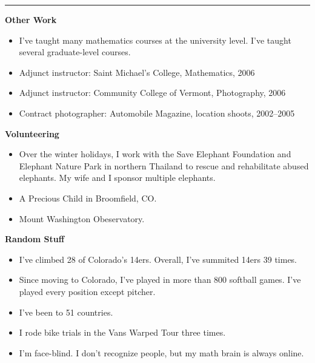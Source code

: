 \documentclass[letterpaper,10pt]{article}
\newcommand{\mblue}{\color{darkblue}}
\begin{document}
\vspace{-2.15pc}
{\hfill\mblue\rule{5.91in}{0.02cm}}

\vspace{1pc}
\textbf{Other Work}

\begin{itemize}
    \item I've taught many mathematics courses at the university level. I've taught several graduate-level courses.
    \item Adjunct instructor: Saint Michael's College, Mathematics, 2006
    \item Adjunct instructor: Community College of Vermont, Photography, 2006
    \item Contract photographer: Automobile Magazine, location shoots, 2002--2005
\end{itemize}

\vspace{1pc}
\textbf{Volunteering}

\begin{itemize}
    \item Over the winter holidays, I work with the Save Elephant Foundation and Elephant Nature Park in northern Thailand to rescue and rehabilitate abused elephants. My wife and I sponsor multiple elephants.
    \item A Precious Child in Broomfield, CO.
    \item Mount Washington Obeservatory.
\end{itemize}

\vspace{1pc}
\textbf{Random Stuff}

\begin{itemize}
    \item I've climbed 28 of Colorado's 14ers. Overall, I've summited 14ers 39 times.
    \item Since moving to Colorado, I've played in more than 800 softball games. I've played every position except pitcher.
    \item I've been to 51 countries.
    \item I rode bike trials in the Vans Warped Tour three times.
    \item I'm face-blind. I don't recognize people, but my math brain is always online.
\end{itemize}
\end{document}
